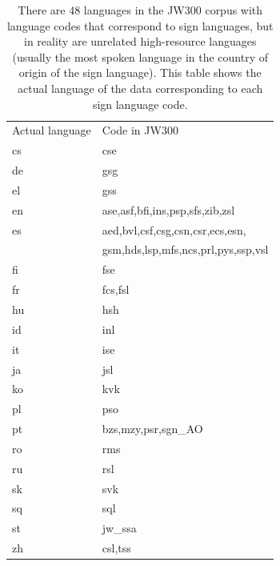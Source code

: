 \begin{table}[t]
    \centering
    \begin{tabular}{ll}
        \toprule
        Actual language & Code in JW300                       \\
        \hdashline
        cs              & cse                                 \\
        de              & gsg                                 \\
        el              & gss                                 \\
        en              & ase,asf,bfi,ins,psp,sfs,zib,zsl     \\
        es              & aed,bvl,csf,csg,csn,csr,ecs,esn,    \\
                        & gsm,hds,lsp,mfs,ncs,prl,pys,ssp,vsl \\
        fi              & fse                                 \\
        fr              & fcs,fsl                             \\
        hu              & hsh                                 \\
        id              & inl                                 \\
        it              & ise                                 \\
        ja              & jsl                                 \\
        ko              & kvk                                 \\
        pl              & pso                                 \\
        pt              & bzs,mzy,psr,sgn\_AO                 \\
        ro              & rms                                 \\
        ru              & rsl                                 \\
        sk              & svk                                 \\
        sq              & sql                                 \\
        st              & jw\_ssa                             \\
        zh              & csl,tss                             \\
        \bottomrule
    \end{tabular}
    \caption{There are 48 languages in the JW300 corpus with language codes that correspond to sign languages, but in reality are unrelated high-resource languages (usually the most spoken language in the country of origin of the sign language). This table shows the actual language of the data corresponding to each sign language code.} %
    \label{tab:signlanguages}
\end{table}



